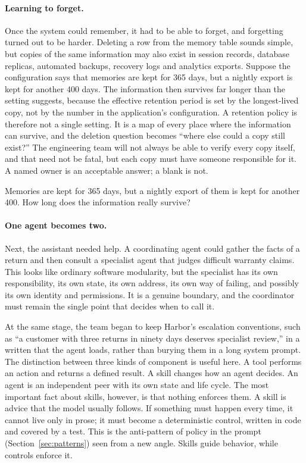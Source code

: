 \paragraph{Learning to forget.} Once the system could remember, it had to be able to forget, and forgetting turned out to be harder. Deleting a row from the memory table sounds simple, but copies of the same information may also exist in session records, database replicas, automated backups, recovery logs and analytics exports. Suppose the configuration says that memories are kept for 365 days, but a nightly export is kept for another 400 days. The information then survives far longer than the setting suggests, because the effective retention period is set by the longest-lived copy, not by the number in the application's configuration. A retention policy is therefore not a single setting. It is a map of every place where the information can survive, and the deletion question becomes ``where else could a copy still exist?'' The engineering team will not always be able to verify every copy itself, and that need not be fatal, but each copy must have someone responsible for it. A named owner is an acceptable answer; a blank is not.

\begin{quickcheck}
Memories are kept for 365 days, but a nightly export of them is kept for another 400. How long does the information really survive?
\end{quickcheck}

\paragraph{One agent becomes two.} Next, the assistant needed help. A coordinating agent could gather the facts of a return and then consult a specialist agent that judges difficult warranty claims. This looks like ordinary software modularity, but the specialist has its own responsibility, its own state, its own address, its own way of failing, and possibly its own identity and permissions. It is a genuine boundary, and the coordinator must remain the single point that decides when to call it.

At the same stage, the team began to keep Harbor's escalation conventions, such as ``a customer with three returns in ninety days deserves specialist review,'' in a written  that the agent loads, rather than burying them in a long system prompt. The distinction between three kinds of component is useful here. A tool performs an action and returns a defined result. A skill changes how an agent decides. An agent is an independent peer with its own state and life cycle. The most important fact about skills, however, is that nothing enforces them. A skill is advice that the model usually follows. If something must happen every time, it cannot live only in prose; it must become a deterministic control, written in code and covered by a test. This is the anti-pattern of policy in the prompt (Section~\ref{sec:patterns}) seen from a new angle. Skills guide behavior, while controls enforce it.

